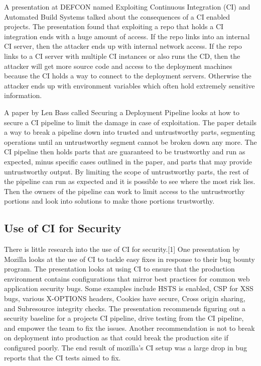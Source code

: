 	A presentation at DEFCON named Exploiting Continuous Integration (CI) and Automated Build Systems talked about the consequences of a CI enabled projects\cite{spaceb0x}. The presentation found that 
    exploiting a repo that holds a CI integration ends with a huge amount of access. If the repo links into an internal CI server, then the attacker ends up with internal network access. If the repo 
    links to a CI server with multiple CI instances or also runs the CD, then the attacker will get more source code and access to the deployment machines because the CI holds a way to connect to the 
    deployment servers. Otherwise the attacker ends up with environment variables which often hold extremely sensitive information.

	A paper by Len Bass called Securing a Deployment Pipeline looks at how to secure a CI pipeline to limit the damage in case of exploitation\cite{Bass}. The paper details a way to break a pipeline 
    down into trusted and untrustworthy parts, segmenting operations until an untrustworthy segment cannot be broken down any more. The CI pipeline then holds parts that are guaranteed to be 
    trustworthy and run as expected, minus specific cases outlined in the paper, and parts that may provide untrustworthy output. By limiting the scope of untrustworthy parts, the rest of the pipeline
    can run as expected and it is possible to see where the most risk lies. Then the owners of the pipeline can work to limit access to the untrustworthy portions and look into solutions to make those
    portions trustworthy.

\subsection{Use of CI for Security}
	There is little research into the use of CI for security.[1] One presentation by Mozilla looks at the use of CI to tackle easy fixes in response to their bug bounty program. The presentation looks
    at using CI to ensure that the production environment contains configurations that mirror best practices for common web application security bugs. Some examples include HSTS is enabled, CSP for 
    XSS bugs, various X-OPTIONS headers, Cookies have secure, Cross origin sharing, and Subresource integrity checks. The presentation recommends figuring out a security baseline for a projects CI 
    pipeline, drive testing from the CI pipeline, and empower the team to fix the issues. Another recommendation is not to break on deployment into production as that could break the production site 
    if configured poorly. The end result of mozilla's CI setup was a large drop in bug reports that the CI tests aimed to fix.

